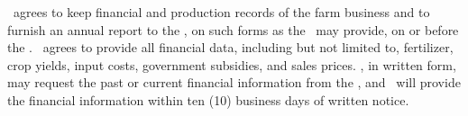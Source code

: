 \lessee\ agrees to keep financial and production records of the farm business and to furnish an annual report to the \lessor, on such forms as the \lessor\ may provide, on or before the \expdate. \lessee\ agrees to provide all financial data, including but not limited to, fertilizer, crop yields, input costs, government subsidies, and sales prices. \lessor, in written form, may request the past or current financial information from the \lessee, and \lessee\ will provide the financial information within ten (10) business days of written notice.
